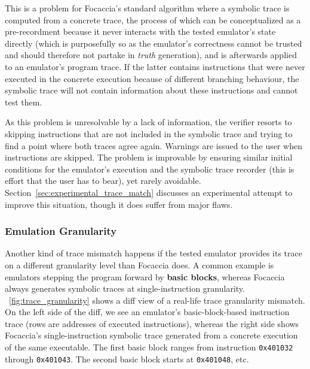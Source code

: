 This is a problem for Focaccia's standard algorithm where a symbolic trace is computed from a concrete trace, the
process of which can be conceptualized as a pre-recordment because it never interacts with the tested emulator's state
directly (which is purposefully so as the emulator's correctness cannot be trusted and should therefore not partake in
\textit{truth} generation), and is afterwards applied to an emulator's program trace. If the latter contains
instructions that were never executed in the concrete execution because of different branching behaviour, the symbolic
trace will not contain information about these instructions and cannot test them.

As this problem is unresolvable by a lack of information, the verifier resorts to skipping instructions that are not
included in the symbolic trace and trying to find a point where both traces agree again. Warnings are issued to the user
when instructions are skipped. The problem is improvable by ensuring similar initial conditions for the emulator's
execution and the symbolic trace recorder (this is effort that the user has to bear), yet rarely avoidable.
Section~\ref{sec:experimental_trace_match} discusses an experimental attempt to improve this situation, though it does
suffer from major flaws.

\subsubsection{Emulation Granularity}

Another kind of trace mismatch happens if the tested emulator provides its trace on a different granularity level than
Focaccia does. A common example is emulators stepping the program forward by \textbf{basic blocks}, whereas Focaccia
always generates symbolic traces at single-instruction granularity. \figurename~\ref{fig:trace_granularity} shows a diff
view of a real-life trace granularity mismatch. On the left side of the diff, we see an emulator's basic-block-based
instruction trace (rows are addresses of executed instructions), whereas the right side shows Focaccia's
single-instruction symbolic trace generated from a concrete execution of the same executable. The first basic block
ranges from instruction \texttt{0x401032} through \texttt{0x401043}. The second basic block starts at \texttt{0x401048},
etc.

